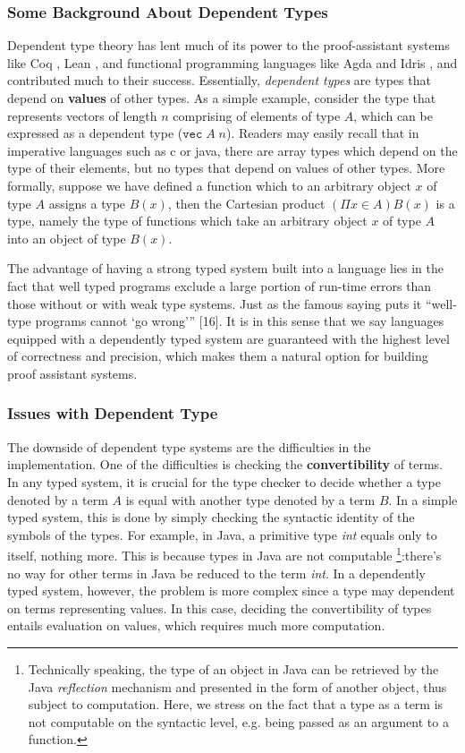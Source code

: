 \documentclass{article}
\theoremstyle{remark}
\begin{document}
\subsubsection{Some Background About Dependent Types}
Dependent type theory has lent much of its power to the proof-assistant systems like Coq \cite{huet1997coq}, Lean \cite{de2015lean}, and functional programming languages like Agda \cite{norell2008dependently} and Idris \cite{brady2013idris}, and contributed much to their success. Essentially, \emph{dependent types} are types that depend on \textbf{values} of other types. As a simple example, consider the type that represents vectors of length $n$ comprising of elements of type $A$, which can be expressed as a dependent type ($\texttt{vec}\; A\; n$). Readers may easily recall that in imperative languages such as c or java, there are array types which depend on the type of their elements, but no types that depend on values of other types. More formally, suppose we have defined a function which to an arbitrary object $x$ of type $A$ assigns a type $B(x)$, then the Cartesian product $(\Pi x \in A)B(x)$ is a type, namely the type of functions which take an arbitrary object $x$ of type $A$ into an object of type $B(x)$.

The advantage of having a strong typed system built into a language lies in the fact that well typed programs exclude a large portion of run-time errors than those without or with weak type systems. Just as the famous saying puts it “well-type programs cannot ‘go wrong’” [16]. It is in this sense that we say languages equipped with a dependently typed system are guaranteed with the highest level of correctness and precision, which makes them a natural option for building proof assistant systems.

\subsubsection{Issues with Dependent Type}
The downside of dependent type systems are the difficulties in the implementation. One of the difficulties is checking the \textbf{convertibility} of terms. In any typed system, it is crucial for the type checker to decide whether a type denoted by a term $A$ is equal with another type denoted by a term $B$. In a simple typed system, this is done by simply checking the syntactic identity of the symbols of the types. For example, in Java, a primitive type \emph{int} equals only to itself, nothing more. This is because types in Java are not computable \footnote{Technically speaking, the type of an object in Java can be retrieved by the Java \emph{reflection} mechanism and presented in the form of another object, thus subject to computation. Here, we stress on the fact that a type as a term is not computable on the syntactic level, e.g. being passed as an argument to a function.}:there's no way for other terms in Java be reduced to the term \emph{int}. In a dependently typed system, however, the problem is more complex since a type may dependent on terms representing values. In this case, deciding the convertibility of types entails evaluation on values, which requires much more computation.
\end{document}
